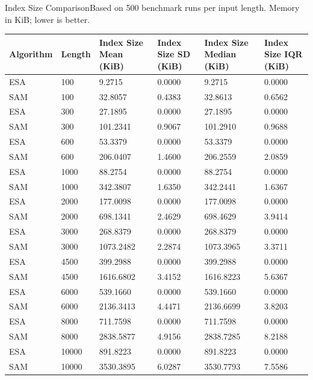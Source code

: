 \begin{benchmarktable}{Index Size Comparison}{Based on 500 benchmark runs per input length. Memory in KiB; lower is better.}
\begin{tabularx}{\textwidth}{|X|X|X|X|X|X|}
\toprule
Algorithm & Length & Index Size Mean (KiB) & Index Size SD (KiB) & Index Size Median (KiB) & Index Size IQR (KiB) \\
\midrule
ESA & 100 & 9.2715 & 0.0000 & 9.2715 & 0.0000 \\
SAM & 100 & 32.8057 & 0.4383 & 32.8613 & 0.6562 \\
\hline
ESA & 300 & 27.1895 & 0.0000 & 27.1895 & 0.0000 \\
SAM & 300 & 101.2341 & 0.9067 & 101.2910 & 0.9688 \\
\hline
ESA & 600 & 53.3379 & 0.0000 & 53.3379 & 0.0000 \\
SAM & 600 & 206.0407 & 1.4600 & 206.2559 & 2.0859 \\
\hline
ESA & 1000 & 88.2754 & 0.0000 & 88.2754 & 0.0000 \\
SAM & 1000 & 342.3807 & 1.6350 & 342.2441 & 1.6367 \\
\hline
ESA & 2000 & 177.0098 & 0.0000 & 177.0098 & 0.0000 \\
SAM & 2000 & 698.1341 & 2.4629 & 698.4629 & 3.9414 \\
\hline
ESA & 3000 & 268.8379 & 0.0000 & 268.8379 & 0.0000 \\
SAM & 3000 & 1073.2482 & 2.2874 & 1073.3965 & 3.3711 \\
\hline
ESA & 4500 & 399.2988 & 0.0000 & 399.2988 & 0.0000 \\
SAM & 4500 & 1616.6802 & 3.4152 & 1616.8223 & 5.6367 \\
\hline
ESA & 6000 & 539.1660 & 0.0000 & 539.1660 & 0.0000 \\
SAM & 6000 & 2136.3413 & 4.4471 & 2136.6699 & 3.8203 \\
\hline
ESA & 8000 & 711.7598 & 0.0000 & 711.7598 & 0.0000 \\
SAM & 8000 & 2838.5877 & 4.9156 & 2838.7285 & 8.2188 \\
\hline
ESA & 10000 & 891.8223 & 0.0000 & 891.8223 & 0.0000 \\
SAM & 10000 & 3530.3895 & 6.0287 & 3530.7793 & 7.5586 \\
\bottomrule
\end{tabularx}
\end{benchmarktable}